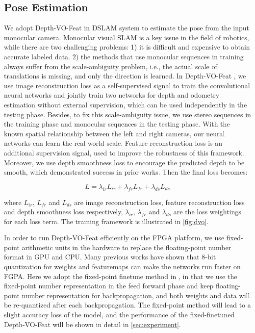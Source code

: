 \subsection{Pose Estimation}
We adopt Depth-VO-Feat \cite{Zhan:2018e92} in DSLAM system to estimate the pose from the input monocular camera. Monocular visual SLAM is a key issue in the field of robotics, while there are two challenging problems: 1) it is difficult and expensive to obtain accurate labeled data. 2) the methods that use monocular sequences in training always suffer from the scale-ambiguity problem, i.e., the actual scale of translations is missing, and only the direction is learned. In Depth-VO-Feat \cite{Zhan:2018e92}, we use image reconstruction loss as a self-supervised signal to train the convolutional neural networks and jointly train two networks for depth and odometry estimation without external supervision, which can be used independently in the testing phase. Besides, to fix this scale-ambiguity issue, we use stereo sequences in the training phase and monocular sequences in the testing phase. With the known spatial relationship between the left and right cameras, our neural networks can learn the real world scale. Feature reconstruction loss is an additional supervision signal, used to improve the robustness of this framework. Moreover, we use depth smoothness loss to encourage the predicted depth to be smooth, which demonstrated success in prior works. Then the final loss becomes:

\begin{equation}
    L=\lambda_{ir}L_{ir}+\lambda_{fr}L_{fr}+\lambda_{ds}L_{ds}
    \label{equ:loss}
\end{equation}

where $L_{ir}$, $L_{fr}$ and $L_{ds}$ are image reconstruction loss, feature reconstruction loss and depth smoothness loss respectively, $\lambda_{ir}$, $\lambda_{fr}$ and $\lambda_{ds}$ are the loss weightings for each loss term. The training framework is illustrated in \cref{fig:dvo}.


In order to run Depth-VO-Feat efficiently on the FPGA platform, we use fixed-point arithmetic units in the hardware to replace the floating-point number format in GPU and CPU. Many previous works have shown that 8-bit quantization for weights and featuremaps can make the networks run faster on FGPA. Here we adopt the fixed-point finetune method in \cite{Yu:2018:IDC:3299999.3283452}, in that we use the fixed-point number representation in the feed forward phase and keep floating-point number representation for backpropagation, and both weights and data will be re-quantized after each backpropagation. The fixed-point method will lead to a slight accuracy loss of the model, and the performance of the fixed-finetuned Depth-VO-Feat will be shown in detail in \cref{sec:experiment}.


